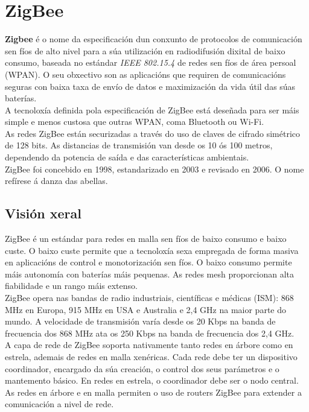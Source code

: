 \section{ZigBee}

\textbf{Zigbee} é o nome da especificación dun conxunto de protocolos de
comunicación sen fíos de alto nivel para a súa utilización en radiodifusión
dixital de baixo consumo, baseada no estándar \textit{IEEE 802.15.4} de redes
sen fíos de área persoal (WPAN). O seu obxectivo son as aplicacións que
requiren de comunicacións seguras con baixa taxa de envío de datos e
maximización da vida útil das súas baterías. \\

A tecnoloxía definida pola especificación de ZigBee está deseñada para ser máis
simple e menos custosa que outras WPAN, coma Bluetooth ou Wi-Fi. \\

As redes ZigBee están securizadas a través do uso de claves de cifrado
simétrico de 128 bits. As distancias de transmisión van desde os 10 ós 100
metros, dependendo da potencia de saída e das características ambientais. \\

ZigBee foi concebido en 1998, estandarizado en 2003 e revisado en 2006. O nome
refírese á danza das abellas.

 \subsection{Visión xeral}

 ZigBee é un estándar para redes en malla sen fíos de baixo consumo e baixo
 custe. O baixo custe permite que a tecnoloxía sexa empregada de forma masiva
 en aplicacións de control e monotorización sen fíos. O baixo consumo permite
 máis autonomía con baterías máis pequenas. As redes mesh proporcionan alta
 fiabilidade e un rango máis extenso. \\

 ZigBee opera nas bandas de radio industriais, científicas e médicas (ISM):
 868 MHz en Europa, 915 MHz en USA e Australia e 2,4 GHz na maior parte do
 mundo. A velocidade de transmisión varía desde os 20 Kbps na banda de
 frecuencia dos 868 MHz ata os 250 Kbps na banda de frecuencia dos 2,4 GHz. \\

 A capa de rede de ZigBee soporta nativamente tanto redes en árbore como en
 estrela, ademais de redes en malla xenéricas. Cada rede debe ter un
 dispositivo coordinador, encargado da súa creación, o control dos seus
 parámetros e o mantemento básico. En redes en estrela, o coordinador debe ser
 o nodo central. As redes en árbore e en malla permiten o uso de routers ZigBee
 para extender a comunicación a nivel de rede.

